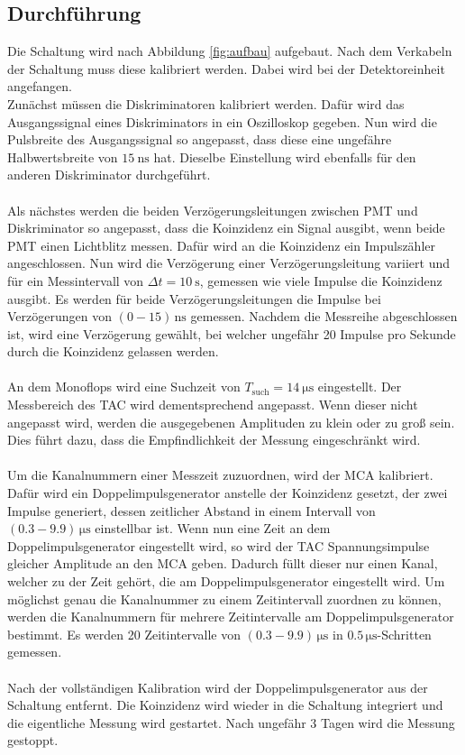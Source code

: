 \subsection{Durchführung}
Die Schaltung wird nach Abbildung \ref{fig:aufbau} aufgebaut.
Nach dem Verkabeln der Schaltung muss diese kalibriert werden.
Dabei wird bei der Detektoreinheit angefangen.\\
Zunächst müssen die Diskriminatoren kalibriert werden.
Dafür wird das Ausgangssignal eines Diskriminators in ein Oszilloskop gegeben.
Nun wird die Pulsbreite des Ausgangssignal so angepasst, dass diese eine ungefähre Halbwertsbreite von $\SI{15}{\nano\second}$ hat.
Dieselbe Einstellung wird ebenfalls für den anderen Diskriminator durchgeführt.\\\\
Als nächstes werden die beiden Verzögerungsleitungen zwischen PMT und Diskriminator so angepasst, dass die Koinzidenz ein Signal ausgibt, wenn beide PMT einen Lichtblitz messen.
Dafür wird an die Koinzidenz ein Impulszähler angeschlossen.
Nun wird die Verzögerung einer Verzögerungsleitung variiert und für ein Messintervall von $\Delta t = \SI{10}{\second}$, gemessen wie viele Impulse die Koinzidenz ausgibt.
Es werden für beide Verzögerungsleitungen die Impulse bei Verzögerungen von $(0-15)\,\si{\nano\second}$ gemessen.
Nachdem die Messreihe abgeschlossen ist, wird eine Verzögerung gewählt, bei welcher ungefähr 20 Impulse pro Sekunde durch die Koinzidenz gelassen werden.\\\\
An dem Monoflops wird eine Suchzeit von $T_\text{such} = \SI{14}{\micro\second}$ eingestellt.
Der Messbereich des TAC wird dementsprechend angepasst.
Wenn dieser nicht angepasst wird, werden die ausgegebenen Amplituden zu klein oder zu groß sein.
Dies führt dazu, dass die Empfindlichkeit der Messung eingeschränkt wird.\\\\
Um die Kanalnummern einer Messzeit zuzuordnen, wird der MCA kalibriert.
Dafür wird ein Doppelimpulsgenerator anstelle der Koinzidenz gesetzt, der zwei Impulse generiert, dessen zeitlicher Abstand in einem Intervall von $(0.3-9.9)\,\si{\micro\second}$ einstellbar ist.
Wenn nun eine Zeit an dem Doppelimpulsgenerator eingestellt wird, so wird der TAC Spannungsimpulse gleicher Amplitude an den MCA geben.
Dadurch füllt dieser nur einen Kanal, welcher zu der Zeit gehört, die am Doppelimpulsgenerator eingestellt wird.
Um möglichst genau die Kanalnummer zu einem Zeitintervall zuordnen zu können, werden die Kanalnummern für mehrere Zeitintervalle am Doppelimpulsgenerator bestimmt.
Es werden 20 Zeitintervalle von $(0.3-9.9)\,\si{\micro\second}$ in $0.5\,\si{\micro\second}$-Schritten gemessen.\\\\
Nach der vollständigen Kalibration wird der Doppelimpulsgenerator aus der Schaltung entfernt.
Die Koinzidenz wird wieder in die Schaltung integriert und die eigentliche Messung wird gestartet.
Nach ungefähr 3 Tagen wird die Messung gestoppt.